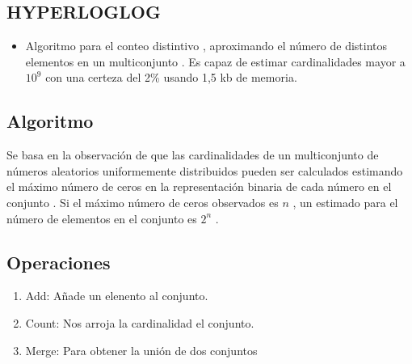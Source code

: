\documentclass{article}
\begin{document}
\begin{multicols*}{2}
\begin{itemize}
\section{HYPERLOGLOG}
\begin{itemize}
    \item Algoritmo para el conteo distintivo , aproximando el número de distintos elementos en un multiconjunto . Es capaz de estimar cardinalidades mayor a $10^9$ con una certeza del 2\% usando 1,5 kb de memoria.
\end{itemize}
\subsection{Algoritmo}
Se basa en la observación de que las cardinalidades de un multiconjunto de números aleatorios uniformemente distribuidos pueden ser calculados estimando el máximo número de ceros en la representación binaria de cada número en el conjunto . Si el máximo número de ceros observados es $n$ , un estimado para el número de elementos en el conjunto es $2^n$ .
\subsection{Operaciones}
 \begin{enumerate}
     \item Add: Añade un elenento al conjunto.
     \item Count: Nos arroja la cardinalidad el conjunto.
     \item Merge: Para obtener la unión de dos conjuntos
 \end{enumerate}
\end{itemize}

\end{multicols*}
\end{document}

